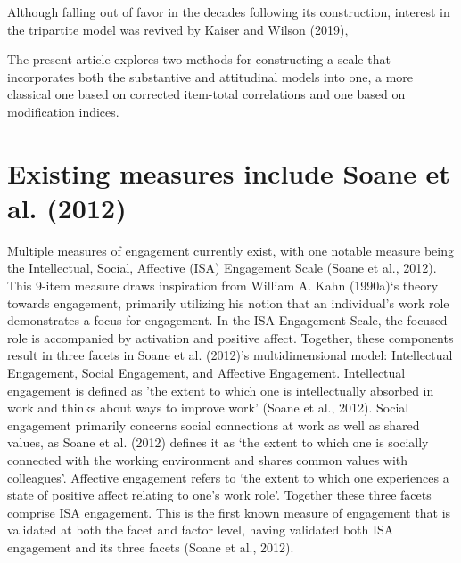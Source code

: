 \documentclass[
  man]{apa6}
\begin{document}
Although falling out of favor in the decades following its construction, interest in the tripartite model was revived by Kaiser and Wilson (2019),

The present article explores two methods for constructing a scale that incorporates both the substantive and attitudinal models into one, a more classical one based on corrected item-total correlations and one based on modification indices.

\hypertarget{existing-measures-include-soane2012development}{%
\section{Existing measures include Soane et al. (2012)}\label{existing-measures-include-soane2012development}}

Multiple measures of engagement currently exist, with one notable measure being the Intellectual, Social, Affective (ISA) Engagement Scale (Soane et al., 2012). This 9-item measure draws inspiration from William A. Kahn (1990a)`s theory towards engagement, primarily utilizing his notion that an individual's work role demonstrates a focus for engagement. In the ISA Engagement Scale, the focused role is accompanied by activation and positive affect. Together, these components result in three facets in Soane et al. (2012)'s multidimensional model: Intellectual Engagement, Social Engagement, and Affective Engagement. Intellectual engagement is defined as 'the extent to which one is intellectually absorbed in work and thinks about ways to improve work' (Soane et al., 2012). Social engagement primarily concerns social connections at work as well as shared values, as Soane et al. (2012) defines it as `the extent to which one is socially connected with the working environment and shares common values with colleagues'. Affective engagement refers to `the extent to which one experiences a state of positive affect relating to one's work role'. Together these three facets comprise ISA engagement. This is the first known measure of engagement that is validated at both the facet and factor level, having validated both ISA engagement and its three facets (Soane et al., 2012).
\end{document}
